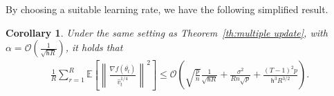 \documentclass[11pt]{article}
\newtheorem{Theorem}{Theorem}
\newtheorem{Corollary}{Corollary}
\newcommand{\beq}{\begin{equation}}
\newcommand{\eeq}{\end{equation}}
\newcommand{\eqdef}{\mathrel{\mathop:}=}
\def\EE{\mathbb{E}}
\def\tot{\mathsf{h}}
\begin{document}
By choosing a suitable learning rate, we have the following simplified result.
\begin{Corollary}\label{coro:main}
Under the same setting as Theorem~\ref{th:multiple update}, with $\alpha = \mathcal{O}(\frac{1}{ \sqrt{\tot R}})$, it holds that
\begin{align} \label{coro:rate}
\frac{1}{R}\sum_{r=1}^R  \EE\left[ \left\| \frac{\nabla f(\overline{\theta_t})}{\hat v_t^{1/4}}   \right \|^2 \right]\leq \mathcal{O}\left( \sqrt{\frac{ p}{n}} \frac{1}{\sqrt{\tot R}} + \frac{\sigma^2 }{R n\sqrt{p}}+\frac{(T-1)^2p}{\tot^3 R^{3/2}}\right).
\end{align}
\end{Corollary}



\end{document}
